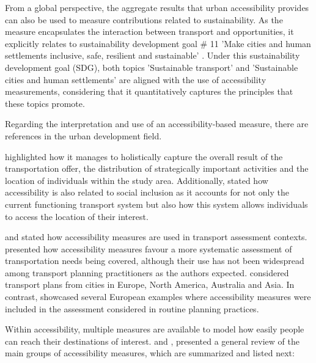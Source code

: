 \documentclass[12pt, a4paper]{report}
\begin{document}

From a global perspective, the aggregate results that urban accessibility provides can also be used to measure contributions related to sustainability. As the measure encapsulates the interaction between transport and opportunities, it explicitly relates to sustainability development goal \# 11 'Make cities and human settlements inclusive, safe, resilient and sustainable' \citep{unitednations17GOALSSustainable2015}. Under this sustainability development goal (SDG), both topics 'Sustainable transport' and 'Sustainable cities and human settlements' are aligned with the use of accessibility measurements, considering that it quantitatively captures the principles that these topics promote.

Regarding the interpretation and use of an accessibility-based measure, there are references in the urban development field.  

\cite{pereiraIntroductionUrbanAccessibility2023a} highlighted how it manages to holistically capture the overall result of the transportation offer, the distribution of strategically important activities and the location of individuals within the study area. Additionally, \cite{pereiraIntroductionUrbanAccessibility2023a} stated how accessibility is also related to social inclusion as it accounts for not only the current functioning transport system but also how this system allows individuals to access the location of their interest.

\cite{papaAccessibilityInstrumentsPlanning2016} and \cite{boisjolyHowGetThere2017} stated how accessibility measures are used in transport assessment contexts. \cite{boisjolyHowGetThere2017} presented how accessibility measures favour a more systematic assessment of transportation needs being covered, although their use has not been widespread among transport planning practitioners as the authors expected. \cite{boisjolyHowGetThere2017} considered transport plans from cities in Europe, North America, Australia and Asia.
In contrast, \cite{papaAccessibilityInstrumentsPlanning2016} showcased several European examples where accessibility measures were included in the assessment considered in routine planning practices.


Within accessibility, multiple measures are available to model how easily people can reach their destinations of interest. \cite{paezMeasuringAccessibilityPositive2012} and \cite{dijstOpportunitiesTransportMode2002}, presented a general review of the main groups of accessibility measures, which are summarized and listed next:
\end{document}
